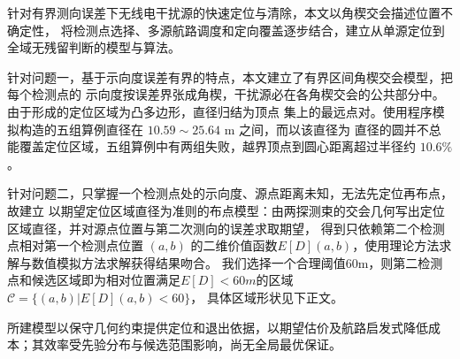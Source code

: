 %
针对有界测向误差下无线电干扰源的快速定位与清除，本文以角楔交会描述位置不确定性，
将检测点选择、多源航路调度和定向覆盖逐步结合，建立从单源定位到全域无残留判断的模型与算法。

{\heiti 针对问题一}\songti，基于示向度误差有界的特点，本文建立了{\heiti 有界区间角楔交会模型}\songti，把每个检测点的
示向度按误差界张成角楔，干扰源必在各角楔交会的公共部分中。由于形成的定位区域为凸多边形，直径归结为顶点
集上的最远点对。使用程序模拟构造的五组算例直径在 $10.59\sim25.64$ m 之间，而{\heiti 以该直径为
直径的圆并不总能覆盖定位区域}\songti，五组算例中有两组失败，越界顶点到圆心距离超过半径约
$10.6\%$。

{\heiti 针对问题二}\songti，只掌握一个检测点处的示向度、源点距离未知，无法先定位再布点，故建立
{\heiti 以期望定位区域直径为准则的布点模型}\songti：由两探测束的交会几何写出定位区域直径，并对源点位置与第二次测向的误差求取期望，
得到只依赖第二个检测点相对第一个检测点位置 $(a,b)$ 的二维价值函数$E[D](a,b)$，使用理论方法求解与数值模拟方法求解获得结果吻合。
我们选择一个合理阈值60m，{\heiti 则第二检测点和候选区域即为相对位置满足}\songti$E[D]< 60m${\heiti 的区域}\songti$\mathcal{C} = \{(a,b)\big|E[D](a,b)< 60\}$，
具体区域形状见下正文。






所建模型以保守几何约束提供定位和退出依据，以期望估价及航路启发式降低成本；其效率受先验分布与候选范围影响，尚无全局最优保证。

